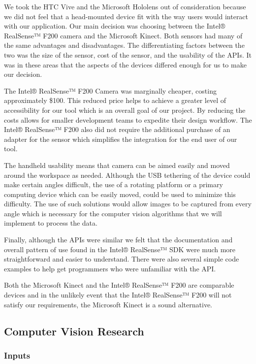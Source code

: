 \documentclass[12pt]{article}
\begin{document}
We took the HTC Vive and the Microsoft Hololens out of consideration
because we did not feel that a head-mounted device fit with the way
users would interact with our application. Our main decision was
choosing between the Intel® RealSense™ F200 camera and the Microsoft
Kinect. Both sensors had many of the same advantages and disadvantages.
The differentiating factors between the two was the size of the sensor,
cost of the sensor, and the usability of the APIs. It was in these areas
that the aspects of the devices differed enough for us to make our
decision.

The Intel® RealSense™ F200 Camera was marginally cheaper, costing
approximately \$100. This reduced price helps to achieve a greater level
of accessibility for our tool which is an overall goal of our project.
By reducing the costs allows for smaller development teams to expedite
their design workflow. The Intel® RealSense™ F200 also did not require
the additional purchase of an adapter for the sensor which simplifies
the integration for the end user of our tool.

The handheld usability means that camera can be aimed easily and moved
around the workspace as needed. Although the USB tethering of the device
could make certain angles difficult, the use of a rotating platform or a
primary computing device which can be easily moved, could be used to
minimize this difficulty. The use of such solutions would allow images
to be captured from every angle which is necessary for the computer
vision algorithms that we will implement to process the data.

Finally, although the APIs were similar we felt that the documentation
and overall pattern of use found in the Intel® RealSense™ SDK were much
more straightforward and easier to understand. There were also several
simple code examples to help get programmers who were unfamiliar with
the API.

Both the Microsoft Kinect and the Intel® RealSense™ F200 are comparable
devices and in the unlikely event that the Intel® RealSense™ F200 will
not satisfy our requirements, the Microsoft Kinect is a sound
alternative.

\subsection{Computer Vision Research}\label{computer-vision-research}

\subsubsection{Inputs}\label{inputs}
\end{document}
